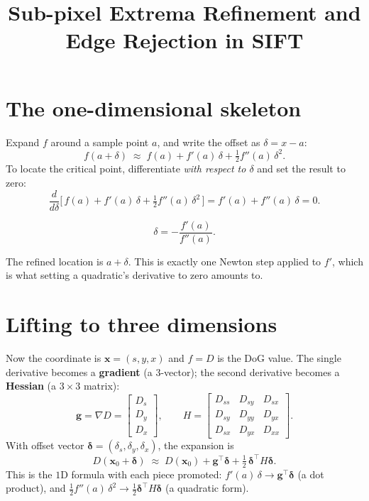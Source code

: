 \documentclass[11pt]{article}
\title{Sub-pixel Extrema Refinement and Edge Rejection in SIFT}
\author{}
\date{}
\begin{document}
\maketitle

\section{The one-dimensional skeleton}

Expand $f$ around a sample point $a$, and write the offset as $\delta = x - a$:
\[
f(a + \delta) \;\approx\; f(a) + f'(a)\,\delta + \tfrac{1}{2} f''(a)\,\delta^2 .
\]
To locate the critical point, differentiate \emph{with respect to $\delta$} and set the
result to zero:
\[
\frac{d}{d\delta}\Big[\, f(a) + f'(a)\,\delta + \tfrac{1}{2}f''(a)\,\delta^2 \,\Big]
= f'(a) + f''(a)\,\delta = 0 .
\]
\begin{keybox}
\[
\delta = -\frac{f'(a)}{f''(a)} .
\]
\end{keybox}
The refined location is $a + \delta$. This is exactly one Newton step applied to $f'$,
which is what setting a quadratic's derivative to zero amounts to.

\section{Lifting to three dimensions}

Now the coordinate is $\mathbf{x} = (s, y, x)$ and $f = D$ is the DoG value. The single
derivative becomes a \textbf{gradient} (a $3$-vector); the second derivative becomes a
\textbf{Hessian} (a $3\times 3$ matrix):
\[
\mathbf{g} = \nabla D =
\begin{bmatrix} D_s \\ D_y \\ D_x \end{bmatrix},
\qquad
H =
\begin{bmatrix}
D_{ss} & D_{sy} & D_{sx} \\
D_{sy} & D_{yy} & D_{yx} \\
D_{sx} & D_{yx} & D_{xx}
\end{bmatrix}.
\]
With offset vector $\boldsymbol{\delta} = (\delta_s, \delta_y, \delta_x)$, the expansion is
\[
D(\mathbf{x}_0 + \boldsymbol{\delta}) \;\approx\;
D(\mathbf{x}_0) + \mathbf{g}^{\top}\boldsymbol{\delta}
+ \tfrac{1}{2}\,\boldsymbol{\delta}^{\top} H \boldsymbol{\delta}.
\]
This is the $1$D formula with each piece promoted:
$f'(a)\,\delta \to \mathbf{g}^{\top}\boldsymbol{\delta}$ (a dot product), and
$\tfrac{1}{2} f''(a)\,\delta^2 \to \tfrac{1}{2}\boldsymbol{\delta}^{\top} H\boldsymbol{\delta}$
(a quadratic form).
\end{document}
